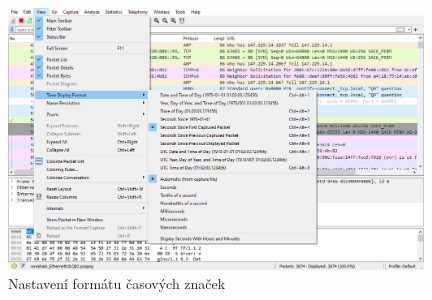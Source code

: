 \begin{figure}[h]
  \centering
  \includegraphics[width=110mm]{fig/time-stamps.png}
  \caption{Nastavení formátu časových značek}\label{fig:time-stamps}
\end{figure}
